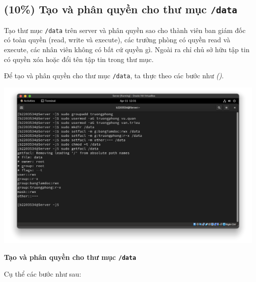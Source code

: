 \subsection{(10\%) Tạo và phân quyền cho thư mục \texttt{/data}}

Tạo thư mục \texttt{/data} trên server và phân quyền sao cho thành viên ban
giám đốc có toàn quyền (read, write và execute), các trưởng phòng có quyền read và
execute, các nhân viên không có bất cứ quyền gì. Ngoài ra chỉ chủ sở hữu tập tin có
quyền xóa hoặc đổi tên tập tin trong thư mục.


Để tạo và phân quyền cho thư mục \texttt{/data}, ta thực theo các bước như \textit{()}.

\begin{minipage}{.93\linewidth}
  \captionsetup{type=figure, skip=-15pt}
  \includegraphics[width=\linewidth]{./imgs/Hinh-17.png}
  \caption{\bfseries Tạo và phân quyền cho thư mục \texttt{/data}}
  \label{fig:create-data-directory}
\end{minipage}

Cụ thể các bước như sau:

